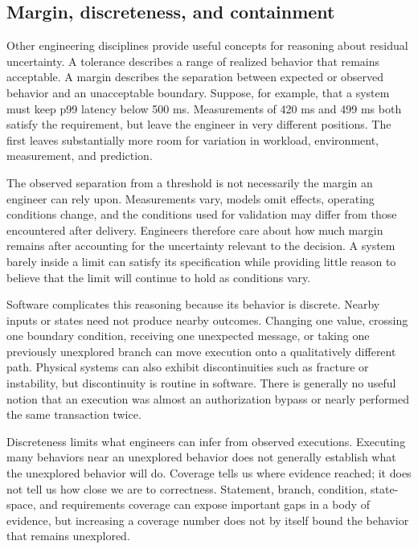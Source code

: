 \subsection{Margin, discreteness, and containment}\label{sec-margin-containment}

Other engineering disciplines provide useful concepts for reasoning about residual uncertainty. A
tolerance describes a range of realized behavior that remains acceptable. A margin describes the
separation between expected or observed behavior and an unacceptable boundary. Suppose, for
example, that a system must keep p99 latency below 500 ms. Measurements of 420 ms and 499 ms both
satisfy the requirement, but leave the engineer in very different positions. The first leaves
substantially more room for variation in workload, environment, measurement, and prediction.

The observed separation from a threshold is not necessarily the margin an engineer can rely upon.
Measurements vary, models omit effects, operating conditions change, and the conditions used for
validation may differ from those encountered after delivery. Engineers therefore care about how
much margin remains after accounting for the uncertainty relevant to the decision. A system barely
inside a limit can satisfy its specification while providing little reason to believe that the
limit will continue to hold as conditions vary.

Software complicates this reasoning because its behavior is discrete. Nearby inputs or states need
not produce nearby outcomes. Changing one value, crossing one boundary condition, receiving one
unexpected message, or taking one previously unexplored branch can move execution onto a
qualitatively different path. Physical systems can also exhibit discontinuities such as fracture or
instability, but discontinuity is routine in software. There is generally no useful notion that an
execution was almost an authorization bypass or nearly performed the same transaction twice.

Discreteness limits what engineers can infer from observed executions. Executing many behaviors
near an unexplored behavior does not generally establish what the unexplored behavior will do.
Coverage tells us where evidence reached; it does not tell us how close we are to correctness.
Statement, branch, condition, state-space, and requirements coverage can expose important gaps in a
body of evidence, but increasing a coverage number does not by itself bound the behavior that
remains unexplored.

